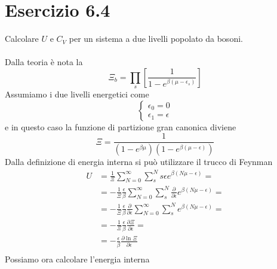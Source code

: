\documentclass[a4paper]{article}
\begin{document}
    \section*{Esercizio 6.4}
        Calcolare $U$ e $C_V$ per un sistema a due livelli popolato da bosoni.
        \\
        \\
        Dalla teoria è nota la
        \begin{equation*}
            \Xi_b=\prod_s\left[\frac{1}{1-e^{\beta(\mu-\epsilon_s)}}\right]
        \end{equation*}
        Assumiamo i due livelli energetici come
        \begin{equation*}
            \begin{cases}
                \epsilon_0=0\\
                \epsilon_1=\epsilon
            \end{cases}
        \end{equation*}
        e in questo caso la funzione di partizione gran canonica diviene
        \begin{equation*}
            \Xi=\frac{1}{(1-e^{\beta\mu})(1-e^{\beta(\mu-\epsilon)})}
        \end{equation*}
        Dalla definizione di energia interna si può utilizzare il trucco di Feynman
        \begin{equation*}
            \begin{split}
                U&=\frac{1}{\Xi}\sum_{N=0}^\infty\sum_{s}^Ns\epsilon e^{\beta(N\mu-\epsilon)}=\\
                &=-\frac{1}{\Xi}\frac{\epsilon}{\beta}\sum_{N=0}^\infty\sum_{s}^N\frac{\partial}{\partial\epsilon}e^{\beta(N\mu-\epsilon)}=\\
                &=-\frac{1}{\Xi}\frac{\epsilon}{\beta}\frac{\partial}{\partial\epsilon}\sum_{N=0}^\infty\sum_{s}^Ne^{\beta(N\mu-\epsilon)}=\\
                &=-\frac{1}{\Xi}\frac{\epsilon}{\beta}\frac{\partial\Xi}{\partial\epsilon}=\\
                &=-\frac{\epsilon}{\beta}\frac{\partial\ln\Xi}{\partial\epsilon}\\
            \end{split}
        \end{equation*}
        Possiamo ora calcolare l'energia interna
\end{document}
